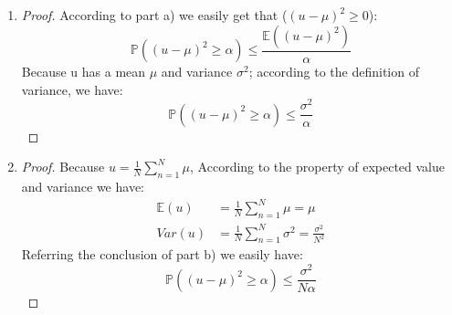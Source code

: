 \documentclass[12pt]{article}
\begin{document}
\begin{enumerate}
\begin{enumerate}
      \item
      \begin{proof}
        According to part a) we easily get that ($(u-\mu)^2 \geq 0 $):
      \begin{equation*}
        \mathbb{P}((u-\mu)^2 \geq \alpha) \leq \frac{\mathbb{E}((u-\mu)^2) }{\alpha}
      \end{equation*}
      Because u has a mean $\mu$ and variance $\sigma^2$; according to the definition of variance, we have:
      \begin{equation*}
        \mathbb{P}((u-\mu)^2 \geq \alpha) \leq \frac{\sigma^2 }{\alpha}
      \end{equation*}
      \end{proof}
      \item
      \begin{proof}
        Because $u=\frac{1}{N}\sum_{n=1}^{N}\mu$, According to the property of expected value and variance we have:
      \begin{equation*}
        \begin{split}
           \mathbb{E}(u) & =\frac{1}{N}\sum_{n=1}^{N}\mu =\mu  \\
             Var(u)& = \frac{1}{N}\sum_{n=1}^{N}\sigma^2 =\frac{\sigma^2}{N^2}
        \end{split}
      \end{equation*}
      Referring the conclusion of part b) we easily have:
      \begin{equation*}
        \mathbb{P}((u-\mu)^2 \geq \alpha) \leq \frac{\sigma^2 }{N\alpha}
      \end{equation*}

      \end{proof}

    \end{enumerate}

\end{enumerate}
 
 
\end{document}
